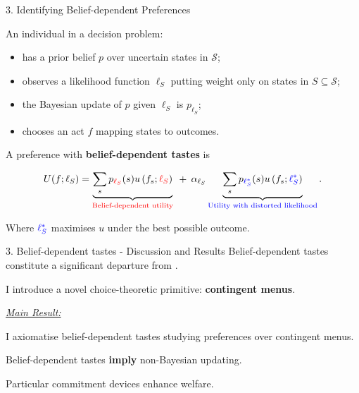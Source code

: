 \documentclass[usenames,dvipsnames,aspectratio=169,11pt,handout]{beamer}
\begin{document}
\begin{frame}[noframenumbering]{3. Identifying Belief-dependent Preferences}

	An individual in a decision problem:

	\vfill

	\begin{itemize}
		\item has a prior belief \( p \) over uncertain states in \( \mathcal{S} \); \pause
		\item observes a likelihood function \( \ell_S \) putting weight only on states in \( S \subseteq \mathcal{S} \); \pause
		\item the Bayesian update of \( p \) given \( \ell_S \) is \( p_{\ell_S} \); \pause
		\item chooses an act \( f \) mapping states to outcomes. \pause
	\end{itemize}

	\vfill

	A preference with \textbf{belief-dependent tastes} is
	\vfill

	\[
		U (f ; \ell_S)= \underbrace{\sum_s p_{\textcolor{red}{\ell_S}} (s) u\left(f_s ; \textcolor{red}{\ell_S} \right)}_{\text{\textcolor{red}{Belief-dependent utility}}} \: \: + \: \: \alpha_{\ell_S} \underbrace{\sum_s p_{\textcolor{blue}{\ell^{*}_{S}}} (s) u\left(f_s ; \textcolor{blue}{\ell^{*}_{S}} \right)}_{\text{\textcolor{blue}{Utility with distorted likelihood}}}.
	\]

	\vfill

	Where \( \textcolor{blue}{\ell^{*}_{S}} \) maximises \( u \) under the best possible outcome.

\end{frame}

\begin{frame}{3. Belief-dependent tastes - Discussion and Results}
	Belief-dependent tastes constitute a significant departure from \cite{savageFoundationsStatistics1972}.

	\vfill

	I introduce a novel choice-theoretic primitive: \textbf{contingent menus}.

	\vfill

	\underline{\textit{Main Result:}}

	I axiomatise belief-dependent tastes studying preferences over contingent menus.

	\vfill

	Belief-dependent tastes \textbf{imply} non-Bayesian updating.

	\vfill

	Particular commitment devices enhance welfare.
\end{frame}
\end{document}
